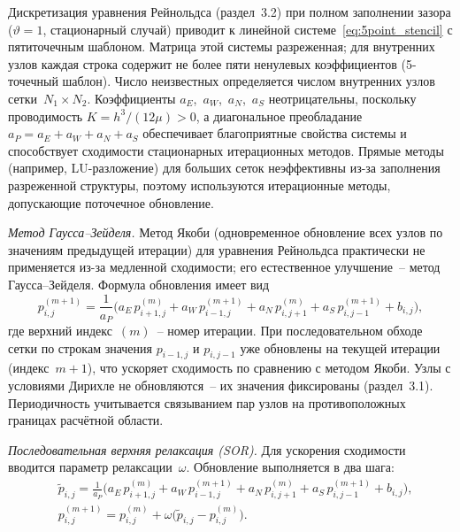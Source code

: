 Дискретизация уравнения Рейнольдса (раздел~3.2) при полном заполнении зазора ($\vartheta = 1$, стационарный случай) приводит к линейной системе~\eqref{eq:5point_stencil} с пятиточечным шаблоном. Матрица этой системы разреженная; для внутренних узлов каждая строка содержит не более пяти ненулевых коэффициентов (5-точечный шаблон). Число неизвестных определяется числом внутренних узлов сетки~$N_1 \times N_2$. Коэффициенты $a_E$,~$a_W$,~$a_N$,~$a_S$ неотрицательны, поскольку проводимость $K = h^3/(12\mu) > 0$, а диагональное преобладание $a_P = a_E + a_W + a_N + a_S$ обеспечивает благоприятные свойства системы и способствует сходимости стационарных итерационных методов. Прямые методы (например, LU-разложение) для больших сеток неэффективны из-за заполнения разреженной структуры, поэтому используются итерационные методы, допускающие поточечное обновление.

\textit{Метод Гаусса–Зейделя.}
Метод Якоби (одновременное обновление всех узлов по значениям предыдущей итерации) для уравнения Рейнольдса практически не применяется из-за медленной сходимости; его естественное улучшение~-- метод Гаусса–Зейделя. Формула обновления имеет вид
\begin{equation}\label{eq:gs_update}
  p_{i,j}^{(m+1)} = \frac{1}{a_P}\bigl(
    a_E\,p_{i+1,j}^{(m)} + a_W\,p_{i-1,j}^{(m+1)}
    + a_N\,p_{i,j+1}^{(m)} + a_S\,p_{i,j-1}^{(m+1)}
    + b_{i,j}\bigr),
\end{equation}
\noindent где верхний индекс~$(m)$~-- номер итерации. При последовательном обходе сетки по строкам значения $p_{i-1,j}$ и $p_{i,j-1}$ уже обновлены на текущей итерации (индекс~$m+1$), что ускоряет сходимость по сравнению с методом Якоби. Узлы с условиями Дирихле не обновляются~-- их значения фиксированы (раздел~3.1). Периодичность учитывается связыванием пар узлов на противоположных границах расчётной области.

\textit{Последовательная верхняя релаксация (SOR).}
Для ускорения сходимости вводится параметр релаксации~$\omega$. Обновление выполняется в два шага:
\begin{equation}\label{eq:sor_update}
\begin{split}
  &\tilde{p}_{i,j} = \frac{1}{a_P}\bigl(
    a_E\,p_{i+1,j}^{(m)} + a_W\,p_{i-1,j}^{(m+1)}
    + a_N\,p_{i,j+1}^{(m)} + a_S\,p_{i,j-1}^{(m+1)}
    + b_{i,j}\bigr), \\
  &p_{i,j}^{(m+1)} = p_{i,j}^{(m)}
    + \omega\bigl(\tilde{p}_{i,j} - p_{i,j}^{(m)}\bigr).
\end{split}
\end{equation}

